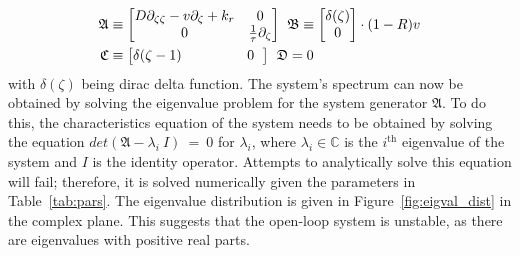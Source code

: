 \begin{equation} \label{eq:operator_A}
    \begin{aligned}
        \mathfrak{A} &\equiv
        \begin{bmatrix}
            D \partial_{\zeta \zeta} - v \partial_\zeta + k_r & 0 \\
            0 & \frac{1}{\tau} \partial_\zeta
        \end{bmatrix} \hspace{0.4em}
        \mathfrak{B} \equiv
        \begin{bmatrix}
            \delta(\zeta) \\
            0
        \end{bmatrix} \cdot (1-R) v \\
        \mathfrak{C} &\equiv
        \begin{bmatrix}
            \delta(\zeta-1) &
            \hspace{3.7em} 0 \hspace{0.6em}
        \end{bmatrix} \hspace{0.42em}
        \mathfrak{D} = 0
    \end{aligned}
\end{equation}
with $\delta(\zeta)$ being dirac delta function. The system's spectrum can now be obtained by solving the eigenvalue problem for the system generator $\mathfrak{A}$. To do this, the characteristics equation of the system needs to be obtained by solving the equation $det(\mathfrak{A}-\lambda_i~I)~=~0$ for $\lambda_i$, where $\lambda_i \in \mathbb{C}$ is the $i^{\text{th}}$ eigenvalue of the system and $I$ is the identity operator. Attempts to analytically solve this equation will fail; therefore, it is solved numerically given the parameters in Table~\ref{tab:pars}. The eigenvalue distribution is given in Figure~\ref{fig:eigval_dist} in the complex plane. This suggests that the open-loop system is unstable, as there are eigenvalues with positive real parts.

